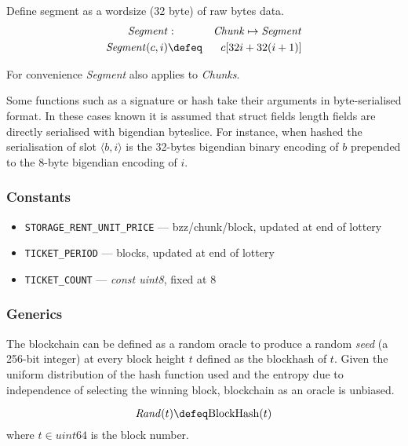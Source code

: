 \begin{definition}[segment]
\label{def:segment}
Define segment as a wordsize (32 byte) of raw bytes data.
\begin{eqnarray}
\mathit{Segment}& : & \mathit{Chunk}\mapsto \mathit{Segment}\\
\mathit{Segment}(c,i)&\defeq&c[32i+32(i+1)]
\end{eqnarray}

For convenience \emph{Segment} also applies to \emph{Chunks}.
\end{definition}


Some functions such as a signature or hash take their arguments in byte-serialised format. In these cases known it is assumed that struct fields length fields  are directly serialised with bigendian byteslice. 
For instance, when hashed the serialisation of slot $\langle b,i\rangle$ is the 32-bytes bigendian binary encoding of $b$ prepended to the 8-byte bigendian encoding of $i$.

\subsubsection{Constants \statusorange}

\begin{itemize}[noitemsep]
    \item[]\texttt{STORAGE\_RENT\_UNIT\_PRICE} --- bzz/chunk/block, updated at end of lottery
    \item[]\texttt{TICKET\_PERIOD} --- blocks,  updated at end of lottery
    \item[]\texttt{TICKET\_COUNT} ---  \textit{const uint8}, fixed at 8
\end{itemize}

\subsubsection{Generics}


\begin{definition}
The blockchain can be defined as a random oracle to produce a random \emph{seed} (a 256-bit integer) at every block height $t$ defined as the blockhash of $t$. Given the uniform distribution of the hash function used and the entropy due to independence of selecting the winning block, blockchain as an oracle is unbiased.

\begin{equation}
    \mathit{Rand}(t) \defeq \mathrm{BlockHash}(t)
\end{equation}
where $t\in uint64$ is the block number.
\end{definition}


